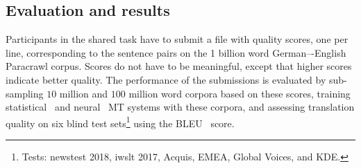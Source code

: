 \subsection{Evaluation and results}

Participants in the shared task have to submit a file with quality scores, one per line, corresponding to the sentence pairs on the 1 billion word German–-English Paracrawl corpus. Scores do not have to be meaningful, except that higher scores indicate better quality. The performance of the submissions is evaluated by sub-sampling $10$ million and $100$ million word corpora based on these scores, training statistical~\cite{Moses} and neural~\cite{Marian} MT systems with these corpora, and assessing translation quality on six blind test sets\footnote{Tests: newstest 2018, iwslt 2017, Acquis, EMEA, Global Voices, and KDE.} using the BLEU~\cite{Bleu} score. 


